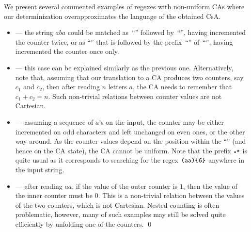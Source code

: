 \documentclass[acmsmall,screen]{acmart}
\begin{document}
\begin{example}
We present several commented examples of regexes with non-uniform CAs
where our determinization overapproximates the language of the obtained CsA.
\begin{itemize}
\item 
{} --- the string $aba$ could be matched as~``''
    followed by~``'', having incremented the counter twice, or as
    ``'' that is followed by the prefix~``''
    of~``'', having incremented the counter once only.
\item 
{} --- this case can be explained similarly as the previous
one. Alternatively, note that, assuming that our translation to a CA produces
two counters, say $c_1$ and $c_2$, then after reading $n$ letters $a$, the CA needs to remember that $c_1 + c_2 = n$. Such non-trivial relations between counter values are not Cartesian.
\item
{} --- assuming a sequence of $a$'s on the input, the
    counter may be either incremented on odd characters and left unchanged on
    even ones, or the other way around.
    As the counter values depend on the position within the ``'' (and
    hence on the CA state), the CA cannot be uniform. 
Note that the prefix $\regex{\DOT*}$ is quite usual as it corresponds to searching
for the regex $\texttt{(aa)\{6\}}$ anywhere in the input string. 
\item 
{} --- after reading $aa$, if the value of the outer
    counter is $1$, then the value of the inner counter must be $0$. This is a
    non-trivial relation between the values of the two counters, which is not Cartesian.
Nested counting is often problematic, however, many of such examples may still be solved quite efficiently by unfolding one of the counters.
\qed
\end{itemize}
\end{example}

\end{document}
